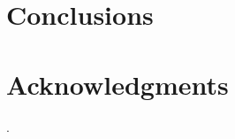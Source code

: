 \documentclass{sig-alternate}
\begin{document}
\section{Conclusions}




\section{Acknowledgments} 

.

%

%
%
\end{document}
